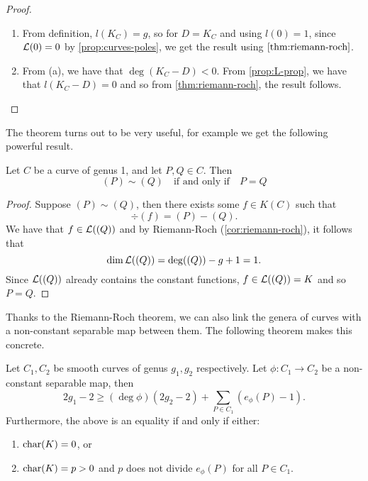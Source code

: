 \begin{proof}
	\begin{enumerate}[itemsep=0em, label=(\alph*)]
		\item From definition, $l(K_C) = g$, so for $D = K_C$ and using 
			$l(0) = 1$, since $\mathcal{L}(0) = 0$ by \ref{prop:curves-poles}, we get the
			result using $\ref{thm:riemann-roch}$.
		\item From (a), we have that $\deg(K_C - D) < 0$. From
			\ref{prop:L-prop}, we have that $l(K_C - D) = 0$ and so
			from \ref{thm:riemann-roch}, the result follows.
	\end{enumerate}
\end{proof}

The theorem turns out to be very useful, for example we get the following 
powerful result.
\begin{proposition}
	\label{prop:sim-implies-eq}
	Let $C$ be a curve of genus 1, and let $P, Q \in C$. Then
	\begin{equation*}
		(P) \sim (Q)
		\quad\textrm{if and only if}\quad
		P = Q
	\end{equation*}
\end{proposition}

\begin{proof}
	Suppose $(P) \sim (Q)$, then there exists some $f \in K(C)$ such that
	\begin{equation*}
		\div(f) = (P) - (Q).
	\end{equation*}
	We have that $f \in \mathcal{L}((Q))$ and by Riemann-Roch (\ref{cor:riemann-roch}),
	it follows that
	\begin{equation*}
		\dim \mathcal{L}((Q)) = \deg((Q)) - g + 1 = 1.
	\end{equation*}
	Since $\mathcal{L}((Q))$ already contains the constant functions, $f \in \mathcal{L}((Q)) = K$
	and so $P = Q$.
\end{proof}

Thanks to the Riemann-Roch theorem, we can also link the genera of 
curves with a non-constant separable map between them.
The following theorem makes this concrete.
\begin{theorem}
	Let $C_1, C_2$ be smooth curves of genus $g_1, g_2$ respectively.
	Let $\phi: C_1 \to C_2$ be a non-constant separable map, then
	\begin{equation*}
		2g_1 - 2 \geq (\deg \phi) (2g_2 - 2) + \sum_{P \in C_1}(e_\phi(P) - 1).
	\end{equation*}
	Furthermore, the above is an equality if and only if either:
	\begin{enumerate}[itemsep=0em, label=(\roman*)]
		\item $\operatorname{char}(K) = 0$, or
		\item $\operatorname{char}(K) = p > 0$ and $p$ does not divide $e_\phi(P)$ for all
			$P \in C_1$.
	\end{enumerate}
\end{theorem}

